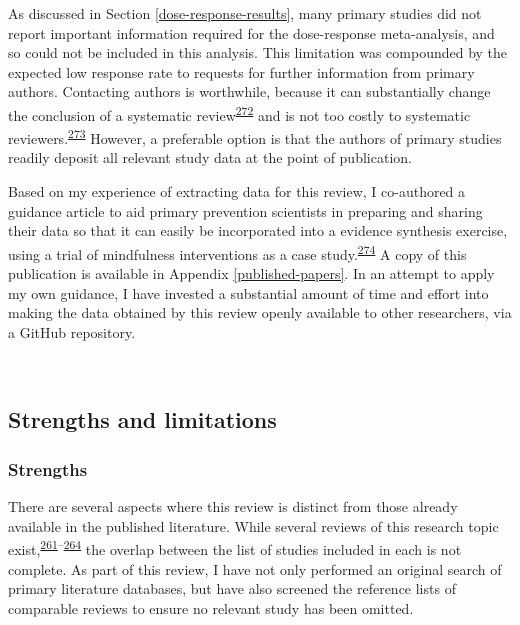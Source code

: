 \documentclass[a4paper, twoside]{templates/ociamthesis}
\begin{document}
As discussed in Section \ref{dose-response-results}, many primary studies did not report important information required for the dose-response meta-analysis, and so could not be included in this analysis. This limitation was compounded by the expected low response rate to requests for further information from primary authors. Contacting authors is worthwhile, because it can substantially change the conclusion of a systematic review\textsuperscript{\protect\hyperlink{ref-meursingereynders2019}{272}} and is not too costly to systematic reviewers.\textsuperscript{\protect\hyperlink{ref-cooper2019}{273}} However, a preferable option is that the authors of primary studies readily deposit all relevant study data at the point of publication.

Based on my experience of extracting data for this review, I co-authored a guidance article to aid primary prevention scientists in preparing and sharing their data so that it can easily be incorporated into a evidence synthesis exercise, using a trial of mindfulness interventions as a case study.\textsuperscript{\protect\hyperlink{ref-hennessy2021}{274}} A copy of this publication is available in Appendix \ref{published-papers}. In an attempt to apply my own guidance, I have invested a substantial amount of time and effort into making the data obtained by this review openly available to other researchers, via a GitHub repository.

~

\hypertarget{strengths-and-limitations}{%
\subsection{Strengths and limitations}\label{strengths-and-limitations}}

\hypertarget{strengths}{%
\subsubsection{Strengths}\label{strengths}}

There are several aspects where this review is distinct from those already available in the published literature. While several reviews of this research topic exist,\textsuperscript{\protect\hyperlink{ref-chu2018}{261}--\protect\hyperlink{ref-poly2020}{264}} the overlap between the list of studies included in each is not complete. As part of this review, I have not only performed an original search of primary literature databases, but have also screened the reference lists of comparable reviews to ensure no relevant study has been omitted.
\end{document}
